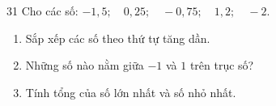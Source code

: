 \clearpage
{}

\begin{probbox}{31}{\relax}
Cho các số: $-1{,}5;\quad 0{,}25;\quad -0{,}75;\quad 1{,}2;\quad -2$.
\begin{enumerate}[label=\alph*),leftmargin=1.6em,itemsep=0pt,topsep=2pt]
  \item Sắp xếp các số theo thứ tự tăng dần.
  \item Những số nào nằm giữa $-1$ và $1$ trên trục số?
  \item Tính tổng của số lớn nhất và số nhỏ nhất.
\end{enumerate}
\end{probbox}

